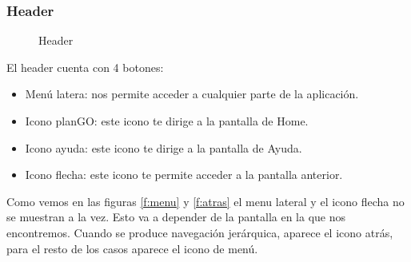 \documentclass[a4paper, 12pt]{book}
\begin{document}
\subsubsection{Header}
\label{sec:header}

\begin{figure}[H]
 \centering
 \caption{Header}
 \label{f:header}
\end{figure}

El header cuenta con 4 botones:

\begin{itemize}
\item Men\'u latera: nos permite acceder a cualquier parte de la aplicaci\'on.

\item Icono planGO: este icono te dirige a la pantalla de Home.
\item Icono ayuda: este icono te dirige a la pantalla de Ayuda.
\item Icono flecha: este icono te permite acceder a la pantalla anterior.
\end{itemize}

Como vemos en las figuras \ref{f:menu} y \ref{f:atras} el menu lateral y el icono flecha no se muestran a la vez.
Esto va a depender de la pantalla en la que nos encontremos. Cuando se produce navegaci\'on
jer\'arquica, aparece el icono atr\'as, para el resto de los casos aparece el icono de men\'u.
\end{document}
